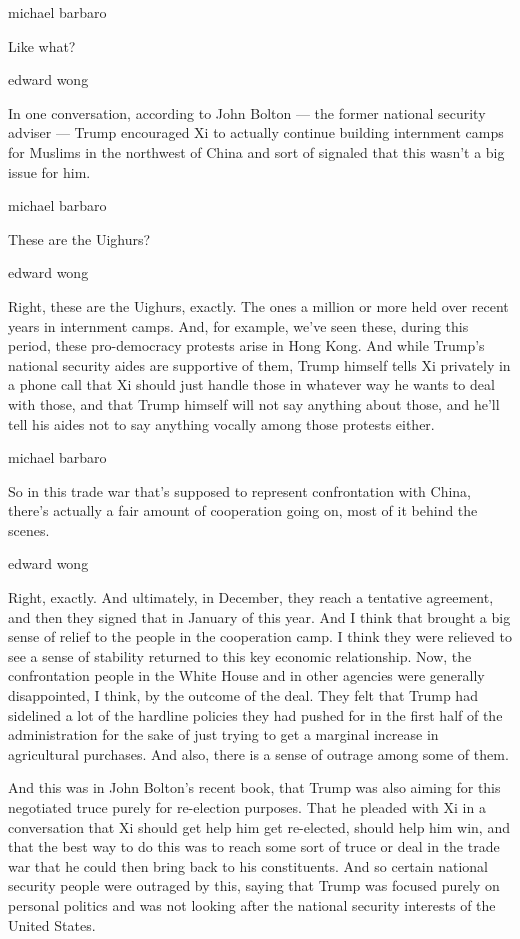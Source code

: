 michael barbaro

Like what?

edward wong

In one conversation, according to John Bolton --- the former national
security adviser --- Trump encouraged Xi to actually continue building
internment camps for Muslims in the northwest of China and sort of
signaled that this wasn't a big issue for him.

michael barbaro

These are the Uighurs?

edward wong

Right, these are the Uighurs, exactly. The ones a million or more held
over recent years in internment camps. And, for example, we've seen
these, during this period, these pro-democracy protests arise in Hong
Kong. And while Trump's national security aides are supportive of them,
Trump himself tells Xi privately in a phone call that Xi should just
handle those in whatever way he wants to deal with those, and that Trump
himself will not say anything about those, and he'll tell his aides not
to say anything vocally among those protests either.

michael barbaro

So in this trade war that's supposed to represent confrontation with
China, there's actually a fair amount of cooperation going on, most of
it behind the scenes.

edward wong

Right, exactly. And ultimately, in December, they reach a tentative
agreement, and then they signed that in January of this year. And I
think that brought a big sense of relief to the people in the
cooperation camp. I think they were relieved to see a sense of stability
returned to this key economic relationship. Now, the confrontation
people in the White House and in other agencies were generally
disappointed, I think, by the outcome of the deal. They felt that Trump
had sidelined a lot of the hardline policies they had pushed for in the
first half of the administration for the sake of just trying to get a
marginal increase in agricultural purchases. And also, there is a sense
of outrage among some of them.

And this was in John Bolton's recent book, that Trump was also aiming
for this negotiated truce purely for re-election purposes. That he
pleaded with Xi in a conversation that Xi should get help him get
re-elected, should help him win, and that the best way to do this was to
reach some sort of truce or deal in the trade war that he could then
bring back to his constituents. And so certain national security people
were outraged by this, saying that Trump was focused purely on personal
politics and was not looking after the national security interests of
the United States.

